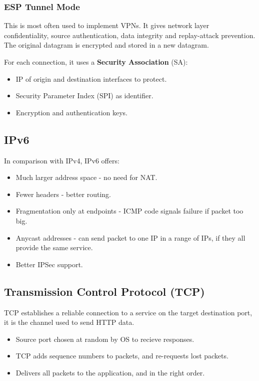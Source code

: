 \documentclass[11pt]{article}
\begin{document}
\subsubsection{ESP Tunnel Mode}
This is most often used to implement VPNs.
It gives network layer confidentiality, source authentication, data integrity and replay-attack prevention.
The original datagram is encrypted and stored in a new datagram.

For each connection, it uses a \textbf{Security Association} (SA):
\begin{itemize}
  \item IP of origin and destination interfaces to protect.
  \item Security Parameter Index (SPI) as identifier.
  \item Encryption and authentication keys.
\end{itemize}

\subsection{IPv6}
In comparison with IPv4, IPv6 offers:
\begin{itemize}
  \item Much larger address space - no need for NAT.
  \item Fewer headers - better routing.
  \item Fragmentation only at endpoints - ICMP code signals failure if packet too big.
  \item Anycast addresses - can send packet to one IP in a range of IPs, if they all provide the same service.
  \item Better IPSec support.
\end{itemize}

\subsection{Transmission Control Protocol (TCP)}
TCP establishes a reliable connection to a service on the target destination port, it is the channel used to send HTTP data.
\begin{itemize}
  \item Source port chosen at random by OS to recieve responses.
  \item TCP adds sequence numbers to packets, and re-requests lost packets.
  \item Delivers all packets to the application, and in the right order.
\end{itemize}
\end{document}
